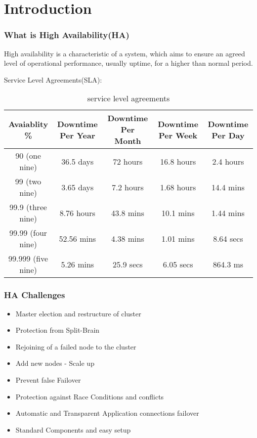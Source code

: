 \section{Introduction}


\begin{frame}
    \frametitle{What is High Availability(HA)}
    High availability is a characteristic of a system, which aims to ensure an agreed level of operational performance, usually uptime, for a higher than normal period.

    Service Level Agreements(SLA):
    \begin{table}
        \centering
        \caption{service level agreements}
        \begin{tabular}{|c|c|c|c|c|}
            \hline
            Avaiablity \%       & Downtime Per Year & Downtime Per Month & Downtime Per Week & Downtime Per Day \\
            \hline
            90 (one nine)       &     36.5 days     &     72 hours       &    16.8 hours     &    2.4 hours     \\
            \hline
            99 (two nine)       &     3.65 days     &     7.2 hours      &    1.68 hours     &    14.4 mins     \\
            \hline
            99.9 (three nine)   &     8.76 hours    &     43.8 mins      &    10.1 mins      &    1.44 mins     \\
            \hline
            99.99 (four nine)   &     52.56 mins    &     4.38 mins      &    1.01 mins      &    8.64 secs     \\
            \hline
            99.999 (five nine)  &     5.26 mins     &     25.9 secs       &    6.05 secs     &    864.3 ms      \\
            \hline
        \end{tabular}
    \end{table}
\end{frame}

\begin{frame}
    \frametitle{HA Challenges}

\begin{itemize}
    \item Master election and restructure of cluster
    \item Protection from Split-Brain
    \item Rejoining of a failed node to the cluster
    \item Add new nodes - Scale up
    \item Prevent false Failover
    \item Protection against Race Conditions and conflicts
    \item Automatic and Transparent Application connections failover
    \item Standard Components and easy setup
\end{itemize}

\end{frame}

